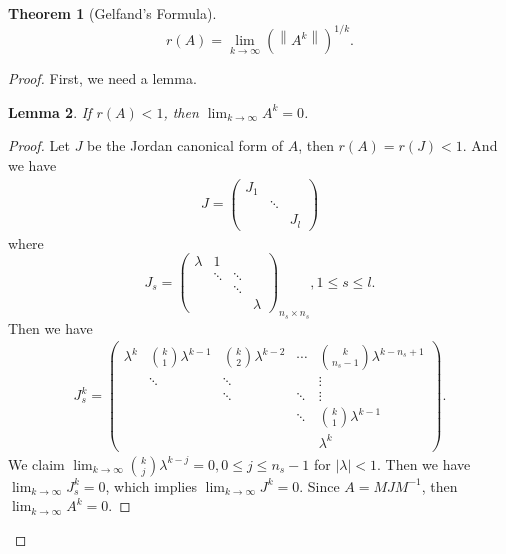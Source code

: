 \documentclass[11pt]{book}
\newtheorem{theorem}{Theorem}[section]
\newtheorem{lemma}[theorem]{Lemma}
\theoremstyle{definition}
\numberwithin{equation}{subsection}
\begin{document}
\begin{theorem}[Gelfand's Formula]
$$r(A) = \lim_{k\to\infty} \left(\left\|A^k\right\|\right)^{1/k}. $$
\end{theorem}
\begin{proof}
First, we need a lemma.
\begin{lemma}
If $r(A) < 1$, then $\lim_{k\to\infty}A^k = 0$.
\end{lemma}
\begin{proof}
Let $J$ be the Jordan canonical form of $A$, then $r(A) = r(J) < 1$. And we have 
\begin{align*}
    J =  \begin{pmatrix}
    J_1 &  &  \\
     & \ddots  &  \\
     &   & J_l
    \end{pmatrix}
\end{align*}
where $$J_s = \left(\begin{smallmatrix}
    \lambda & 1 &  & \\
     & \ddots  & \ddots & \\
     &   & \ddots &  \\
     &   &   & \lambda
\end{smallmatrix}\right)_{n_s\times n_s}, 1\leq s\leq l.$$
Then we have 
\begin{align*}
    J_s^k = \begin{pmatrix}
    \lambda^k & \binom{k}{1}\lambda^{k-1} & \binom{k}{2}\lambda^{k-2} & \cdots & \binom{k}{n_s-1} \lambda^{k - n_s +1} \\
     & \ddots  & \ddots &  & \vdots \\
     &         & \ddots &  \ddots & \vdots \\
     &         &        &  \ddots & \binom{k}{1}\lambda^{k-1} \\
     &         &        &         & \lambda^k
    \end{pmatrix}.
\end{align*}
We claim $\lim_{k\to\infty}\binom{k}{j}\lambda^{k-j} = 0, 0\leq j\leq n_s-1$ for $|\lambda| < 1$. Then we have $\lim_{k\to\infty} J_s^k = 0$, which implies $\lim_{k\to\infty} J^k = 0$. Since $A = MJM^{-1}$, then $\lim_{k\to\infty} A^k = 0$.
\end{proof}


\end{proof}
\end{document}
